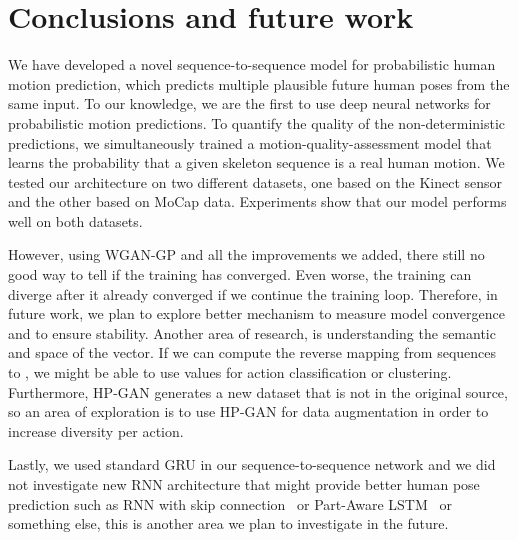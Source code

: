 \documentclass[10pt,twocolumn,letterpaper]{article}
\begin{document}
\section{Conclusions and future work}

We have developed a novel sequence-to-sequence model for probabilistic human motion prediction, which predicts multiple plausible future human poses from the same input. To our knowledge, we are the first to use deep neural networks for probabilistic motion predictions. To quantify the quality of the non-deterministic predictions, we simultaneously trained a motion-quality-assessment model that learns the probability that a given skeleton sequence is a real human motion. We tested our architecture on two different datasets, one based on the Kinect sensor and the other based on MoCap data. Experiments show that our model performs well on both datasets.

However, using WGAN-GP and all the improvements we added, there still no good way to tell if the training has converged. Even worse, the training can diverge after it already converged if we continue the training loop. Therefore, in future work, we plan to explore better mechanism to measure model convergence and to ensure stability. Another area of research, is understanding the semantic and space of the  vector. If we can compute the reverse mapping from sequences to , we might be able to use  values for action classification or clustering. Furthermore, HP-GAN generates a new dataset that is not in the original source, so an area of exploration is to use HP-GAN for data augmentation in order to increase diversity per action. 

Lastly, we used standard GRU in our sequence-to-sequence network and we did not investigate new RNN architecture that might provide better human pose prediction such as RNN with skip connection~\cite{cvpr2017:julieta} or Part-Aware LSTM~\cite{cvpr2016:Shahroudy} or something else, this is another area we plan to investigate in the future.

\clearpage

{\small


}
\end{document}
